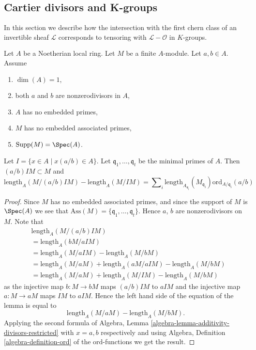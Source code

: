\subsection{Cartier divisors and K-groups}
\label{subsection-cartier-coherent}

\noindent
In this section we describe how the intersection with the
first chern class of an invertible sheaf $\mathcal{L}$
corresponds to tensoring with $\mathcal{L} - \mathcal{O}$
in $K$-groups.

\begin{lemma}
\label{lemma-no-embedded-points-modules}
Let $A$ be a Noetherian local ring.
Let $M$ be a finite $A$-module.
Let $a, b \in A$.
Assume
\begin{enumerate}
\item $\dim(A) = 1$,
\item both $a$ and $b$ are nonzerodivisors in $A$,
\item $A$ has no embedded primes,
\item $M$ has no embedded associated primes,
\item $\text{Supp}(M) = \Spec(A)$.
\end{enumerate}
Let $I = \{x \in A \mid x(a/b) \in A\}$.
Let $\mathfrak q_1, \ldots, \mathfrak q_t$ be the minimal
primes of $A$. Then $(a/b)IM \subset M$ and
$$
\text{length}_A(M/(a/b)IM)
-
\text{length}_A(M/IM)
=
\sum\nolimits_i
\text{length}_{A_{\mathfrak q_i}}(M_{\mathfrak q_i})
\text{ord}_{A/\mathfrak q_i}(a/b)
$$
\end{lemma}

\begin{proof}
Since $M$ has no embedded associated primes, and since
the support of $M$ is $\Spec(A)$ we see that
$\text{Ass}(M) = \{\mathfrak q_1, \ldots, \mathfrak q_t\}$.
Hence $a$, $b$ are nonzerodivisors on $M$. Note that
\begin{align*}
& \text{length}_A(M/(a/b)IM) \\
& = \text{length}_A(bM/aIM) \\
& = \text{length}_A(M/aIM)
-
\text{length}_A(M/bM) \\
& = \text{length}_A(M/aM) + \text{length}_A(aM/aIM) - \text{length}_A(M/bM) \\
& = \text{length}_A(M/aM) + \text{length}_A(M/IM) - \text{length}_A(M/bM)
\end{align*}
as the injective map $b : M \to bM$ maps $(a/b)IM$ to $aIM$
and the injective map $a : M \to aM$ maps $IM$ to $aIM$.
Hence the left hand side of the equation of the lemma is
equal to
$$
\text{length}_A(M/aM) - \text{length}_A(M/bM).
$$
Applying the second formula of
Algebra, Lemma \ref{algebra-lemma-additivity-divisors-restricted}
with $x = a, b$ respectively
and using Algebra, Definition \ref{algebra-definition-ord}
of the $\text{ord}$-functions we get the result.
\end{proof}

